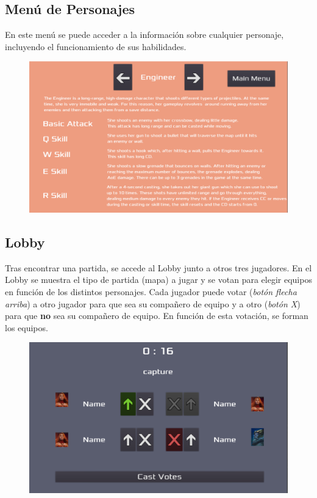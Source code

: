 \newpage

\subsection{Menú de Personajes}
En este menú se puede acceder a la información sobre cualquier personaje, incluyendo el funcionamiento de sus habilidades.

\vspace{\baselineskip}

\begin{figure}[H]
	\centering
	\includegraphics[width=0.7\linewidth]{figures/CharacterMenu}
	\label{fig:CharacterMenu}
\end{figure}

\vspace{\baselineskip}
\vspace{\baselineskip}

\subsection{Lobby}
Tras encontrar una partida, se accede al Lobby junto a otros tres jugadores. En el Lobby se muestra el tipo de partida (mapa) a jugar y se votan para elegir equipos en función de los distintos personajes. Cada jugador puede votar (\emph{botón flecha arriba}) a otro jugador para que sea su compañero de equipo y a otro (\emph{botón X}) para que \textbf{no} sea su compañero de equipo. En función de esta votación, se forman los equipos.

\vspace{\baselineskip}

\begin{figure}[H]
	\centering
	\includegraphics[width=0.7\linewidth]{figures/Lobby}
	\label{fig:Lobby}
\end{figure}
